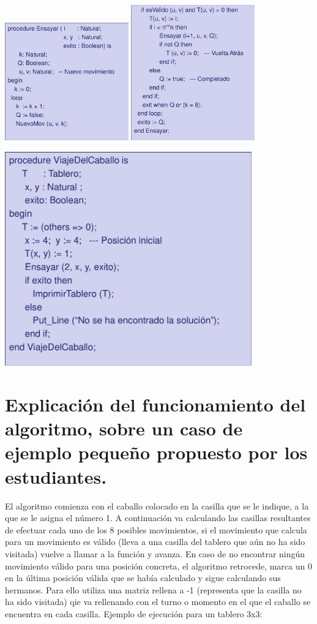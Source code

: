 \documentclass[a4paper, 11pt]{article}
\begin{document}
	\includegraphics[width=0.4\textwidth]{asd.png}
\includegraphics[width=0.4\textwidth]{asd2.png}
								
\includegraphics[width=0.8\textwidth]{asd3.png}


\section{Explicación del funcionamiento del algoritmo, sobre un caso de ejemplo pequeño propuesto por los estudiantes.}

El algoritmo comienza con el caballo colocado en la casilla que se le indique, a la que se le asigna el número 1. A continuación va calculando las casillas resultantes de efectuar cada uno de los 8 posibles movimientos, si el movimiento que calcula para un movimiento es válido (lleva a una casilla del tablero que aún no ha sido visitada) vuelve a llamar a la función y avanza. En caso de no encontrar ningún movimiento válido para una posición concreta, el algoritmo retrocede, marca un 0 en la última posición válida que se había calculado y sigue calculando sus hermanos. Para ello utiliza una matriz rellena a -1 (representa que la casilla no ha sido visitada) qie va rellenando con el turno o momento en el que el caballo se encuentra en cada casilla. Ejemplo de ejecución para un tablero 3x3: 
\end{document}
